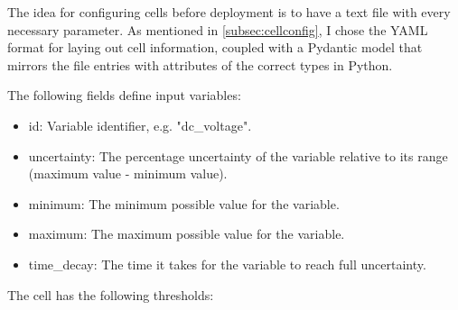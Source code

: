The idea for configuring cells before deployment is to have a text file with every necessary parameter. As mentioned in \ref{subsec:cellconfig}, I chose the YAML format for laying out cell information, coupled with a Pydantic \cite{pydantic} model that mirrors the file entries with attributes of the correct types in Python.

The following fields define input variables:
\begin{itemize}
    \item id: Variable identifier, e.g. "dc\_voltage".
    \item uncertainty: The percentage uncertainty of the variable relative to its range (maximum value - minimum value).
    \item minimum: The minimum possible value for the variable.
    \item maximum: The maximum possible value for the variable.
    \item time\_decay: The time it takes for the variable to reach full uncertainty.
\end{itemize}

The cell has the following thresholds:

